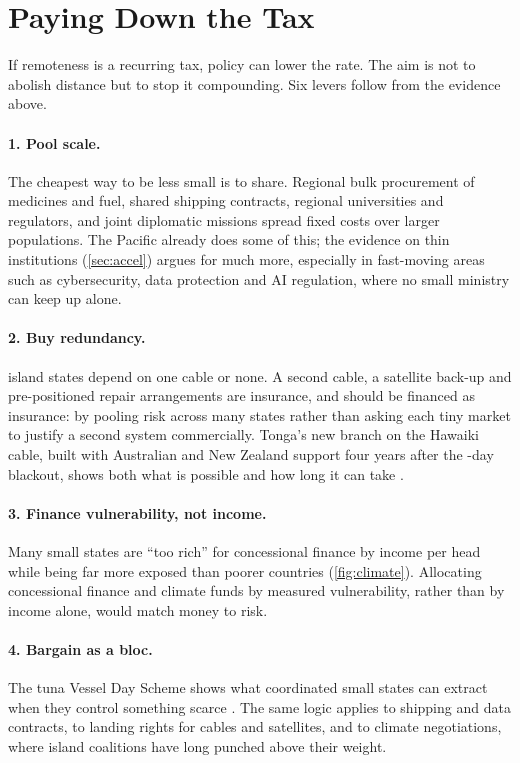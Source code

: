 \section{Paying Down the Tax}
\label{sec:paying}

If remoteness is a recurring tax, policy can lower the rate. The aim is not to
abolish distance but to stop it compounding. Six levers follow from the
evidence above.

\paragraph{1. Pool scale.} The cheapest way to be less small is to share.
Regional bulk procurement of medicines and fuel, shared shipping contracts,
regional universities and regulators, and joint diplomatic missions spread
fixed costs over larger populations. The Pacific already does some of this;
the evidence on thin institutions (\cref{sec:accel}) argues for much more,
especially in fast-moving areas such as cybersecurity, data protection and AI
regulation, where no small ministry can keep up alone.

\paragraph{2. Buy redundancy.} \nSIDSOneCable{} island states depend on one
cable or none. A second cable, a satellite back-up and pre-positioned repair
arrangements are insurance, and should be financed as insurance: by pooling
risk across many states rather than asking each tiny market to justify a
second system commercially. Tonga's new branch on the Hawaiki cable, built
with Australian and New Zealand support four years after the
\tongaOutageDays-day blackout, shows both what is possible and how long it
can take \parencite{aiffp2026tonga}.

\paragraph{3. Finance vulnerability, not income.} Many small states are
\enquote{too rich} for concessional finance by income per head while being far
more exposed than poorer countries (\cref{fig:climate}). Allocating
concessional finance and climate funds by measured vulnerability, rather than
by income alone, would match money to risk.

\paragraph{4. Bargain as a bloc.} The tuna Vessel Day Scheme shows what
coordinated small states can extract when they control something scarce
\parencite{aqorau2009}. The same logic applies to shipping and data
contracts, to landing rights for cables and satellites, and to climate
negotiations, where island coalitions have long punched above their weight.

